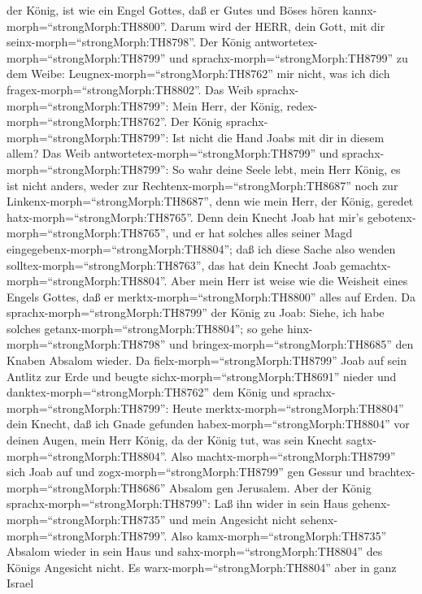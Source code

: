 der König, ist wie ein Engel Gottes, daß er Gutes und Böses hören
kannx-morph=``strongMorph:TH8800''. Darum wird der HERR, dein Gott, mit
dir seinx-morph=``strongMorph:TH8798''.  Der König
antwortetex-morph=``strongMorph:TH8799'' und
sprachx-morph=``strongMorph:TH8799'' zu dem Weibe:
Leugnex-morph=``strongMorph:TH8762'' mir nicht, was ich dich
fragex-morph=``strongMorph:TH8802''. Das Weib
sprachx-morph=``strongMorph:TH8799'': Mein Herr, der König,
redex-morph=``strongMorph:TH8762''.  Der König
sprachx-morph=``strongMorph:TH8799'': Ist nicht die Hand Joabs mit dir
in diesem allem? Das Weib antwortetex-morph=``strongMorph:TH8799'' und
sprachx-morph=``strongMorph:TH8799'': So wahr deine Seele lebt, mein
Herr König, es ist nicht anders, weder zur
Rechtenx-morph=``strongMorph:TH8687'' noch zur
Linkenx-morph=``strongMorph:TH8687'', denn wie mein Herr, der König,
geredet hatx-morph=``strongMorph:TH8765''. Denn dein Knecht Joab hat
mir's gebotenx-morph=``strongMorph:TH8765'', und er hat solches alles
seiner Magd eingegebenx-morph=``strongMorph:TH8804'';  daß
ich diese Sache also wenden solltex-morph=``strongMorph:TH8763'', das
hat dein Knecht Joab gemachtx-morph=``strongMorph:TH8804''. Aber mein
Herr ist weise wie die Weisheit eines Engels Gottes, daß er
merktx-morph=``strongMorph:TH8800'' alles auf Erden.  Da
sprachx-morph=``strongMorph:TH8799'' der König zu Joab: Siehe, ich habe
solches getanx-morph=``strongMorph:TH8804''; so gehe
hinx-morph=``strongMorph:TH8798'' und
bringex-morph=``strongMorph:TH8685'' den Knaben Absalom wieder.
 Da fielx-morph=``strongMorph:TH8799'' Joab auf sein
Antlitz zur Erde und beugte sichx-morph=``strongMorph:TH8691'' nieder
und danktex-morph=``strongMorph:TH8762'' dem König und
sprachx-morph=``strongMorph:TH8799'': Heute
merktx-morph=``strongMorph:TH8804'' dein Knecht, daß ich Gnade gefunden
habex-morph=``strongMorph:TH8804'' vor deinen Augen, mein Herr König, da
der König tut, was sein Knecht sagtx-morph=``strongMorph:TH8804''.
 Also machtx-morph=``strongMorph:TH8799'' sich Joab auf und
zogx-morph=``strongMorph:TH8799'' gen Gessur und
brachtex-morph=``strongMorph:TH8686'' Absalom gen Jerusalem.
 Aber der König sprachx-morph=``strongMorph:TH8799'': Laß
ihn wider in sein Haus gehenx-morph=``strongMorph:TH8735'' und mein
Angesicht nicht sehenx-morph=``strongMorph:TH8799''. Also
kamx-morph=``strongMorph:TH8735'' Absalom wieder in sein Haus und
sahx-morph=``strongMorph:TH8804'' des Königs Angesicht nicht.
 Es warx-morph=``strongMorph:TH8804'' aber in ganz Israel
